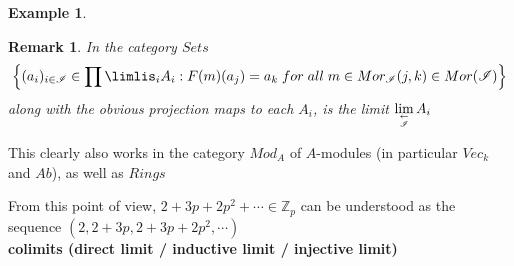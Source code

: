 \documentclass{article}
\newtheorem{example}[theorem]{Example}
\newtheorem{remark}[theorem]{Remark}
\begin{document}
\begin{example}
\begin{center}
    \end{center}
\end{example}
\begin{remark}
    In the category $Sets$
    $$
    \left\{(a_i)_{i\in\mathscr I} \in \prod\limlis_i A_i : F(m)(a_j) = a_k\; for\; all\; m \in Mor_{\mathscr I} (j, k) \in Mor(\mathscr I )\right\}
    $$
    along with the obvious projection maps to each $A_i$, is the limit $\lim\limits_{\leftarrow\atop\mathscr I}A_i$
\end{remark}
This clearly also works in the category $Mod_A$ of $A$-modules (in particular $Vec_k$
and $Ab$), as well as $Rings$

From this point of view, $2 + 3p + 2p^2 + \cdots \in\mathbb Z_p$ can be understood as the
sequence $(2, 2 + 3p, 2 + 3p + 2p^2
, \cdots)$
\\

\textbf{colimits (direct
limit / inductive limit / injective limit)}
\end{document}
